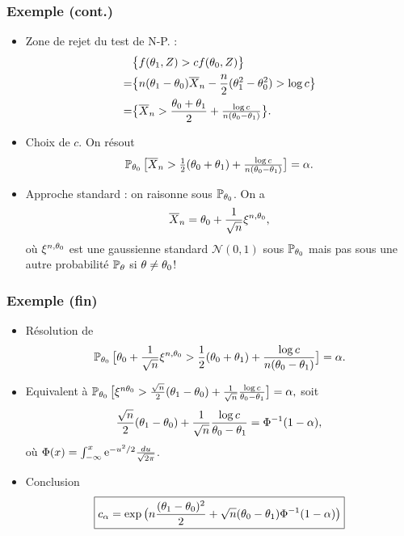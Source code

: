 \begin{frame}
\frametitle{Exemple (cont.)}
\begin{itemize}
\item \alert{Zone de rejet} du test de N-P. :
\begin{align*}
& \big\{f(\theta_1,Z) >  cf(\theta_0,Z)\big\}\\
  =& \big\{n(\theta_1-\theta_0)\overline{X}_n-\frac{n}{2}(\theta_1^2-\theta_0^2) > \log c\big\} \\
 =& \big\{\overline{X}_n > \frac{\theta_0+\theta_1}{2}+\tfrac{\log c}{n(\theta_0-\theta_1)}\big\}.
\end{align*}
\item \alert{Choix de $c$}. On résout
$$\operatorname{{\mathbb P}}_{\theta_0}\big[\overline{X}_n > \tfrac{1}{2}(\theta_0+\theta_1)+\tfrac{\log c}{n(\theta_0-\theta_1)}\big]=\alpha.$$
\item \alert{Approche standard} : on raisonne sous $\operatorname{{\mathbb P}}_{\theta_0}$. On a
$$\overline{X}_n = \theta_0 + \frac{1}{\sqrt{n}}\xi^{n,\theta_0},$$
où $\xi^{n,\theta_0}$ est une gaussienne standard ${\mathcal N}(0,1)$ sous $\operatorname{{\mathbb P}}_{\theta_0}$ \alert{mais pas sous une autre probabilité $\operatorname{{\mathbb P}}_\theta$ si $\theta \neq \theta_0$!}
\end{itemize}
\end{frame}

\begin{frame}
\frametitle{Exemple (fin)}
\begin{itemize}
\item \alert{Résolution de}
$$\operatorname{{\mathbb P}}_{\theta_0}\big[\theta_0 + \frac{1}{\sqrt{n}}\xi^{n,\theta_0} > \frac{1}{2}(\theta_0+\theta_1)+\frac{\log c}{n(\theta_0-\theta_1)}\big]=\alpha.$$
\item \alert{Equivalent à}
$\operatorname{{\mathbb P}}_{\theta_0}\big[\xi^{n\theta_0} > \frac{\sqrt{n}}{2}(\theta_1-\theta_0)+\frac{1}{\sqrt{n}}\frac{\log c}{\theta_0-\theta_1}\big]=\alpha,$
soit
$$\frac{\sqrt{n}}{2}(\theta_1-\theta_0)+\frac{1}{\sqrt{n}}\frac{\log c}{\theta_0-\theta_1}=\Phi^{-1}(1-\alpha),$$
où $\Phi(x) = \int_{-\infty}^x \mathrm{e}^{-u^2/2}\tfrac{du}{\sqrt{2\pi}}$.
\item \alert{Conclusion}
$$\boxed{c_\alpha = \exp\big(n\frac{(\theta_1-\theta_0)^2}{2}+\sqrt{n}(\theta_0-\theta_1)\Phi^{-1}(1-\alpha)\big)}$$
\end{itemize}
\end{frame}


